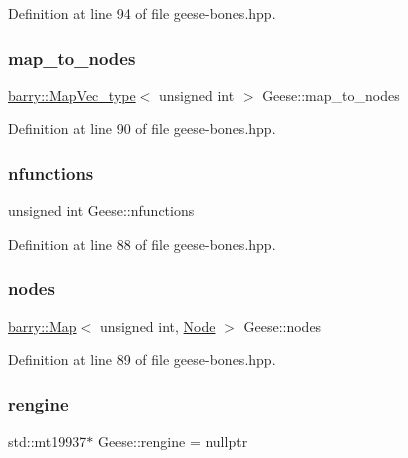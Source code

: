 Definition at line 94 of file geese-\/bones.\+hpp.

\mbox{\label{class_geese_a25f8324ae2c43b8a940a8e934c768a7c}} 
\subsubsection{\texorpdfstring{map\+\_\+to\+\_\+nodes}{map\_to\_nodes}}
{\footnotesize\ttfamily \hyperlink{namespacebarry_a2f0d3aab1d67e4c8eaeab9022e16139f}{barry\+::\+Map\+Vec\+\_\+type}$<$ unsigned int $>$ Geese\+::map\+\_\+to\+\_\+nodes}



Definition at line 90 of file geese-\/bones.\+hpp.

\mbox{\label{class_geese_a0483807174fe427f5bd2ccbb22ac3ad6}} 
\subsubsection{\texorpdfstring{nfunctions}{nfunctions}}
{\footnotesize\ttfamily unsigned int Geese\+::nfunctions}



Definition at line 88 of file geese-\/bones.\+hpp.

\mbox{\label{class_geese_aa574cf418c542fea64f630a3202e314f}} 
\subsubsection{\texorpdfstring{nodes}{nodes}}
{\footnotesize\ttfamily \hyperlink{namespacebarry_a979a04835a9855ff2054c383c569c89e}{barry\+::\+Map}$<$ unsigned int, \hyperlink{class_node}{Node} $>$ Geese\+::nodes}



Definition at line 89 of file geese-\/bones.\+hpp.

\mbox{\label{class_geese_a182ea45cab39d2c3ae6164d7f0bad30a}} 
\subsubsection{\texorpdfstring{rengine}{rengine}}
{\footnotesize\ttfamily std\+::mt19937$\ast$ Geese\+::rengine = nullptr}



